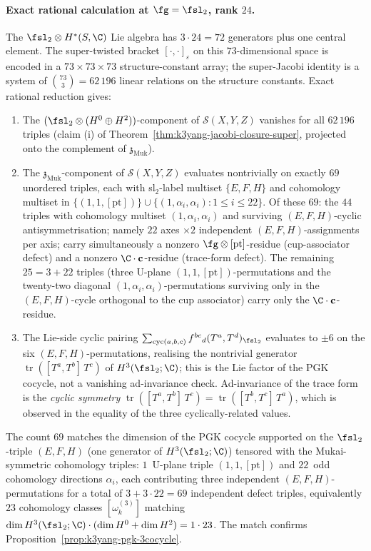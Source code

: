 \paragraph{Exact rational calculation at \texorpdfstring{$\fg = \fsl_2$}{g = fsl-2}, rank \texorpdfstring{$24$}{24}.}
The $\fsl_2 \otimes H^*(S, \C)$ Lie algebra has
$3 \cdot 24 = 72$ generators plus one central element. The
super-twisted bracket $[\cdot, \cdot]_{\varepsilon}$ on this
$73$-dimensional space is encoded in a
$73 \times 73 \times 73$ structure-constant array; the
super-Jacobi identity is a system of
$\binom{73}{3} = 62\,196$ linear relations on the structure
constants. Exact rational reduction gives:
\begin{enumerate}[label=\textup{(\alph*)}]
\item The $(\fsl_2 \otimes (H^0 \oplus H^2))$-component of
 $\mathcal S(X, Y, Z)$ vanishes for all $62\,196$ triples (claim
 (i) of Theorem~\ref{thm:k3yang-jacobi-closure-super}, projected
 onto the complement of $\mathfrak z_{\mathrm{Muk}}$).
\item The $\mathfrak z_{\mathrm{Muk}}$-component of
 $\mathcal S(X, Y, Z)$ evaluates nontrivially on exactly $69$
 unordered triples, each with sl$_2$-label multiset $\{E, F, H\}$
 and cohomology multiset in
 $\{(1, 1, [\mathrm{pt}])\} \cup \{(1, \alpha_i, \alpha_i) : 1 \leq i \leq 22\}$.
 Of these $69$: the $44$ triples with cohomology multiset
 $(1, \alpha_i, \alpha_i)$ and surviving $(E, F, H)$-cyclic
 antisymmetrisation; namely $22$ axes $\times 2$ independent
 $(E, F, H)$-assignments per axis; carry simultaneously a
 nonzero $\fg \otimes [\mathrm{pt}]$-residue (cup-associator
 defect) and a nonzero $\C \cdot \mathbf c$-residue
 (trace-form defect). The remaining $25 = 3 + 22$ triples
 (three U-plane $(1, 1, [\mathrm{pt}])$-permutations and the
 twenty-two diagonal $(1, \alpha_i, \alpha_i)$-permutations
 surviving only in the $(E, F, H)$-cycle orthogonal to the cup
 associator) carry only the $\C \cdot \mathbf c$-residue.
\item The Lie-side cyclic pairing
 $\sum_{\mathrm{cyc}(a, b, c)} f^{bc}{}_d (T^a, T^d)_{\fsl_2}$
 evaluates to $\pm 6$ on the six $(E, F, H)$-permutations,
 realising the nontrivial generator
 $\operatorname{tr}([T^a, T^b]\, T^c)$ of $H^3(\fsl_2; \C)$; this
 is the Lie factor of the PGK cocycle, not a vanishing
 ad-invariance check. Ad-invariance of the trace form is the
 \emph{cyclic symmetry}
 $\operatorname{tr}([T^a, T^b]\, T^c) = \operatorname{tr}([T^b, T^c]\, T^a)$,
 which is observed in the equality of the three
 cyclically-related values.
\end{enumerate}
The count $69$ matches the dimension of the PGK cocycle supported
on the $\fsl_2$-triple $(E, F, H)$ (one generator of
$H^3(\fsl_2; \C)$) tensored with the Mukai-symmetric cohomology
triples: $1$~U-plane triple $(1, 1, [\mathrm{pt}])$ and $22$~odd
cohomology directions $\alpha_i$, each contributing three independent
$(E, F, H)$-permutations for a total of $3 + 3 \cdot 22 = 69$
independent defect triples, equivalently $23$ cohomology classes
$[\omega^{(3)}_k]$ matching
$\dim H^3(\fsl_2; \C) \cdot (\dim H^0 + \dim H^2) = 1 \cdot 23$.
The match confirms Proposition~\ref{prop:k3yang-pgk-3cocycle}.

